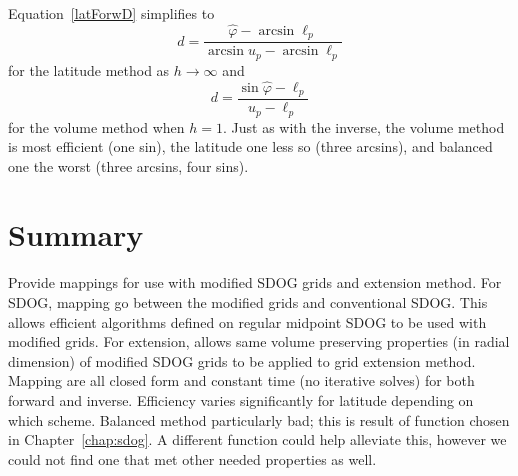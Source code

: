 Equation~\ref{latForwD} simplifies to
%
\begin{equation*}
d = \frac{ \hat{\varphi} - \arcsin \ell_p }{ \arcsin u_p - \arcsin \ell_p}
\end{equation*}
%
for the latitude method as $h \rightarrow \infty$ and
%
\begin{equation*}
d = \frac{ \sin \hat{\varphi} - \ell_p }{ u_p - \ell_p }
\end{equation*}
%
for the volume method when $h = 1$.
Just as with the inverse, the volume method is most efficient (one sin), the latitude one less so (three arcsins), and balanced one the worst (three arcsins, four sins).


\section{Summary}
Provide mappings for use with modified SDOG grids and extension method.
For SDOG, mapping go between the modified grids and conventional SDOG.
This allows efficient algorithms defined on regular midpoint SDOG to be used with modified grids.
For extension, allows same volume preserving properties (in radial dimension) of modified SDOG grids to be applied to grid extension method.
Mapping are all closed form and constant time (no iterative solves) for both forward and inverse.
Efficiency varies significantly for latitude depending on which scheme.
Balanced method particularly bad; this is result of function chosen in Chapter~\ref{chap:sdog}.
A different function could help alleviate this, however we could not find one that met other needed properties as well.
